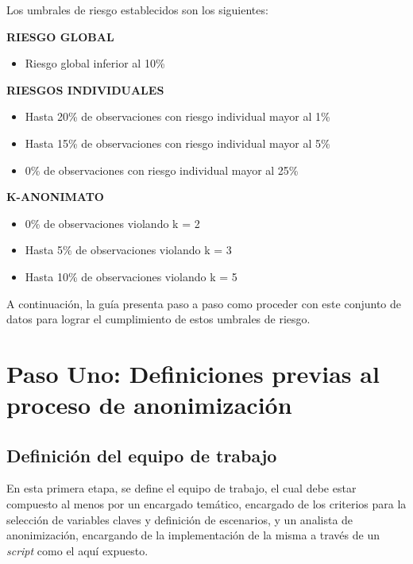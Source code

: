 \documentclass[
]{book}
\providecommand{\tightlist}{%
  \setlength{\itemsep}{0pt}\setlength{\parskip}{0pt}}
\theoremstyle{definition}
\theoremstyle{definition}
\theoremstyle{definition}
\theoremstyle{definition}
\theoremstyle{remark}
\begin{document}
Los umbrales de riesgo establecidos son los siguientes:

\textbf{RIESGO GLOBAL}

\begin{itemize}
\tightlist
\item
  Riesgo global inferior al 10\%
\end{itemize}

\textbf{RIESGOS INDIVIDUALES}

\begin{itemize}
\tightlist
\item
  Hasta 20\% de observaciones con riesgo individual mayor al 1\%
\item
  Hasta 15\% de observaciones con riesgo individual mayor al 5\%
\item
  0\% de observaciones con riesgo individual mayor al 25\%
\end{itemize}

\textbf{K-ANONIMATO}

\begin{itemize}
\tightlist
\item
  0\% de observaciones violando k = 2
\item
  Hasta 5\% de observaciones violando k = 3
\item
  Hasta 10\% de observaciones violando k = 5
\end{itemize}

A continuación, la guía presenta paso a paso como proceder con este conjunto de datos para lograr el cumplimiento de estos umbrales de riesgo.

\hypertarget{paso-uno-definiciones-previas-al-proceso-de-anonimizaciuxf3n}{%
\section{Paso Uno: Definiciones previas al proceso de anonimización}\label{paso-uno-definiciones-previas-al-proceso-de-anonimizaciuxf3n}}

\hypertarget{definiciuxf3n-del-equipo-de-trabajo}{%
\subsection{Definición del equipo de trabajo}\label{definiciuxf3n-del-equipo-de-trabajo}}

En esta primera etapa, se define el equipo de trabajo, el cual debe estar compuesto al menos por un encargado temático, encargado de los criterios para la selección de variables claves y definición de escenarios, y un analista de anonimización, encargando de la implementación de la misma a través de un \emph{script} como el aquí expuesto.
\end{document}
